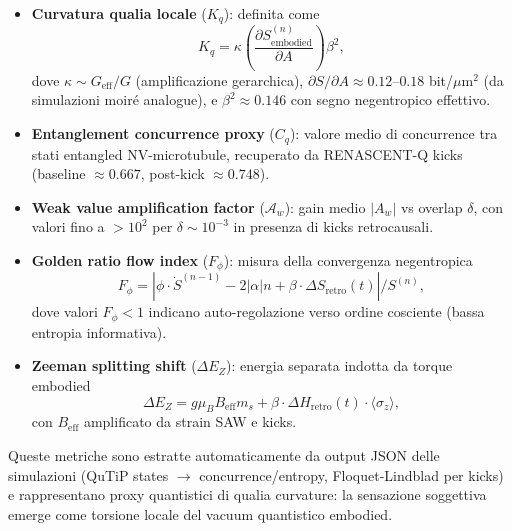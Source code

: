 \documentclass[11pt,a4paper]{article}
\theoremstyle{plain}
\theoremstyle{definition}
\begin{document}
\begin{itemize}
    \item \textbf{Curvatura qualia locale} ($K_q$): definita come
    \begin{equation}
    K_q = \kappa \left( \frac{\partial S_{\text{embodied}}^{(n)}}{\partial A} \right) \beta^2,
    \label{eq:qualia-curvature}
    \end{equation}
    dove $\kappa \sim G_{\text{eff}}/G$ (amplificazione gerarchica), $\partial S / \partial A \approx 0.12$--$0.18$ bit/$\mu$m$^2$ (da simulazioni moiré analogue), e $\beta^2 \approx 0.146$ con segno negentropico effettivo.

    \item \textbf{Entanglement concurrence proxy} ($C_q$): valore medio di concurrence tra stati entangled NV-microtubule, recuperato da RENASCENT-Q kicks (baseline $\approx 0.667$, post-kick $\approx 0.748$).

    \item \textbf{Weak value amplification factor} ($\mathcal{A}_w$): gain medio $|A_w|$ vs overlap $\delta$, con valori fino a $>10^2$ per $\delta \sim 10^{-3}$ in presenza di kicks retrocausali.

    \item \textbf{Golden ratio flow index} ($F_{\phi}$): misura della convergenza negentropica
    \begin{equation}
    F_{\phi} = \left| \phi \cdot \dot{S}^{(n-1)} - 2|\alpha| n + \beta \cdot \Delta S_{\text{retro}}(t) \right| / S^{(n)},
    \label{eq:golden-flow-index}
    \end{equation}
    dove valori $F_{\phi} < 1$ indicano auto-regolazione verso ordine cosciente (bassa entropia informativa).

    \item \textbf{Zeeman splitting shift} ($\Delta E_Z$): energia separata indotta da torque embodied
    \begin{equation}
    \Delta E_Z = g \mu_B B_{\text{eff}} m_s + \beta \cdot \Delta H_{\text{retro}}(t) \cdot \langle \sigma_z \rangle,
    \label{eq:zeeman-shift-qualia}
    \end{equation}
    con $B_{\text{eff}}$ amplificato da strain SAW e kicks.
\end{itemize}

Queste metriche sono estratte automaticamente da output JSON delle simulazioni (QuTiP states $\to$ concurrence/entropy, Floquet-Lindblad per kicks) e rappresentano proxy quantistici di qualia curvature: la sensazione soggettiva emerge come torsione locale del vacuum quantistico embodied.
\end{document}
